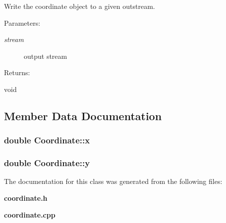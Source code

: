 Write the coordinate object to a given outstream. \begin{Desc}
\item[Parameters: ]\par
\begin{description}
\item[{\em 
stream}]output stream \end{description}
\end{Desc}
\begin{Desc}
\item[Returns: ]\par
void \end{Desc}


\subsection{Member Data Documentation}
\subsubsection{\setlength{\rightskip}{0pt plus 5cm}double Coordinate::x\hspace{0.3cm}{\tt  [protected]}}\label{classCoordinate_n0}


\subsubsection{\setlength{\rightskip}{0pt plus 5cm}double Coordinate::y\hspace{0.3cm}{\tt  [protected]}}\label{classCoordinate_n1}




The documentation for this class was generated from the following files:\begin{CompactItemize}
\item 
{\bf coordinate.h}\item 
{\bf coordinate.cpp}\end{CompactItemize}

